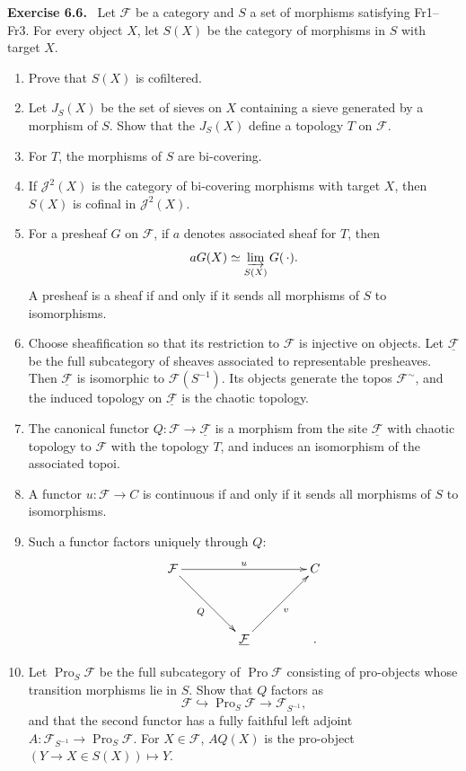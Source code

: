 \documentclass[11pt]{article}
\newcommand{\F}{\mathcal{F}}
\newcommand{\Pro}{\operatorname{Pro}}
\newenvironment{remarktext}[1]{\par\medskip\noindent\textbf{#1.}\ }{\par\medskip}
\begin{document}
\begin{remarktext}{Exercise 6.6}
Let \(\F\) be a category and \(S\) a set of morphisms satisfying Fr1--Fr3. For every object \(X\), let \(S(X)\) be the category of morphisms in \(S\) with target \(X\).
\begin{enumerate}[label=\alph*)]
\item Prove that \(S(X)\) is cofiltered.
\item Let \(J_S(X)\) be the set of sieves on \(X\) containing a sieve generated by a morphism of \(S\). Show that the \(J_S(X)\) define a topology \(T\) on \(\F\).
\item For \(T\), the morphisms of \(S\) are bi-covering.
\item If \(\mathcal J^2(X)\) is the category of bi-covering morphisms with target \(X\), then \(S(X)\) is cofinal in \(\mathcal J^2(X)\).
\item For a presheaf \(G\) on \(\F\), if \(a\) denotes associated sheaf for \(T\), then
\[
 aG(X)\simeq\varinjlim_{S(X)}G(\,\cdot).
\]
A presheaf is a sheaf if and only if it sends all morphisms of \(S\) to isomorphisms.
\item Choose sheafification so that its restriction to \(\F\) is injective on objects. Let \(\underline{\F}\) be the full subcategory of sheaves associated to representable presheaves. Then \(\underline{\F}\) is isomorphic to \(\F(S^{-1})\). Its objects generate the topos \(\F^{\sim}\), and the induced topology on \(\underline{\F}\) is the chaotic topology.
\item The canonical functor \(Q:\F\to\underline{\F}\) is a morphism from the site \(\underline{\F}\) with chaotic topology to \(\F\) with the topology \(T\), and induces an isomorphism of the associated topoi.
\item A functor \(u:\F\to C\) is continuous if and only if it sends all morphisms of \(S\) to isomorphisms.
\item Such a functor factors uniquely through \(Q\):
\[
\xymatrix@=1.5cm{\F\ar[rr]^u\ar[rd]_Q&&C\\&\underline{\F}\ar[ru]_v&.}
\]
\item Let \(\Pro_S\F\) be the full subcategory of \(\Pro\F\) consisting of pro-objects whose transition morphisms lie in \(S\). Show that \(Q\) factors as
\[
\F\hookrightarrow\Pro_S\F\to\F_{S^{-1}},
\]
and that the second functor has a fully faithful left adjoint \(A:\F_{S^{-1}}\to\Pro_S\F\). For \(X\in\F\), \(AQ(X)\) is the pro-object \((Y\to X\in S(X))\mapsto Y\).
\end{enumerate}
\end{remarktext}
\end{document}
